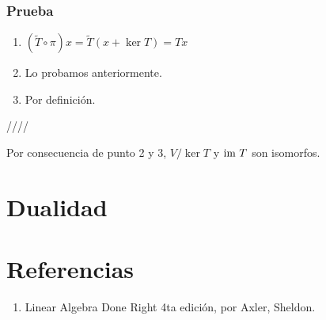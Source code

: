 \documentclass{article}
\begin{document}
\subsubsection*{Prueba}
\begin{enumerate}
    \item $(\widetilde{T}\circ\pi)x = \widetilde{T}(x+\ker T) = Tx$
    \item Lo probamos anteriormente.
    \item Por definición.
\end{enumerate}
\hfill ////

Por consecuencia de punto 2 y 3, $V/\ker T$ y $\text{im } T$ son
isomorfos.
\newpage

\section{Dualidad}

\newpage
\section*{Referencias}
\begin{enumerate}
    \item Linear Algebra Done Right 4ta edición, por Axler, Sheldon.
\end{enumerate}
\end{document}
